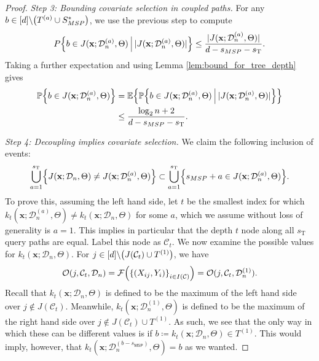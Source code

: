 \documentclass[11pt]{article}
\newcommand{\bx}{\mathbf{x}}
\DeclarePairedDelimiter{\braces}{\lbrace}{\rbrace}
\DeclarePairedDelimiter{\paren}{(}{)}
\DeclarePairedDelimiter{\abs}{|}{|}
\renewcommand{\P}{\mathbb{P}}
\newcommand{\E}{\mathbb{E}}
\newcommand{\cell}{\mathcal{C}}
\newcommand{\sparsity}{s}
\newcommand{\nfeats}{d}
\newcommand{\nsamples}{n}
\newcommand{\coordindices}{[\nfeats]}
\newcommand{\data}[1][n]{\mathcal{D}_{#1}}
\newcommand{\cellfeatindices}{J}
\newcommand{\MSP}{\textsf{MSP}}
\newcommand{\suppset}{S^*}
\newcommand{\traversal}{T}
\newcommand{\traversalsize}{\sparsity_{\operatorname{T}}}
\begin{document}
\begin{proof}
    \textit{Step 3: Bounding covariate selection in coupled paths.}
    For any $b \in \coordindices\backslash\paren*{\traversal^{(a)}\cup\suppset_{\MSP}}$, we use the previous step to compute
    \begin{equation}
        P\braces*{b \in J(\bx;\data^{(a)},\Theta)~\vline~\abs{J(\bx;\data^{(a)},\Theta)}} \leq \frac{\abs{J(\bx;\data^{(a)},\Theta)}}{\nfeats - \sparsity_{\MSP}-\traversalsize}.
    \end{equation}
    Taking a further expectation and using Lemma \ref{lem:bound_for_tree_depth} gives
    \begin{equation}
    \begin{split}
        \P\braces*{b \in J(\bx;\data^{(a)},\Theta)} & = \E\braces*{\P\braces*{b \in J(\bx;\data^{(a)},\Theta)~\vline~\abs{J(\bx;\data^{(a)},\Theta)}}} \\
        & \leq \frac{\log_2 \nsamples + 2}{\nfeats - \sparsity_{\MSP}-\traversalsize}.
    \end{split}
    \end{equation}

    \textit{Step 4: Decoupling implies covariate selection.}
    We claim the following inclusion of events:
    \begin{equation}
    \label{eq:non_msp_decoupling_covariate_selection}
        \bigcup_{a=1}^{\traversalsize}\braces*{J(\bx;\data,\Theta) \neq J(\bx;\data^{(a)},\Theta)} \subset \bigcup_{a=1}^{\traversalsize}\braces*{\sparsity_{\MSP} + a \in J(\bx;\data^{(a)},\Theta)}.
    \end{equation}
    To prove this, assuming the left hand side, let $t$ be the smallest index for which $k_t(\bx;\data^{(a)},\Theta) \neq k_t(\bx;\data,\Theta)$ for some $a$, which we assume without loss of generality is $a=1$.
    This implies in particular that the depth $t$ node along all $\traversalsize$ query paths are equal.
    Label this node as $\cell_t$.
    We now examine the possible values for $k_t(\bx;\data,\Theta)$.
    For $j \in \coordindices\backslash\paren*{\cellfeatindices(\cell_t)\cup\traversal^{(1)}}$, we have
    \begin{equation}
        \mathcal{O}(j,\cell_t,\data) = \mathcal{F}\paren*{\braces*{(X_{ij},Y_i)}_{i \in I(\cell)}} = \mathcal{O}(j,\cell_t,\data^{(1)}).
    \end{equation}
    Recall that $k_t(\bx;\data,\Theta)$ is defined to be the maximum of the left hand side over $j \notin \cellfeatindices(\cell_t)$.
    Meanwhile, $k_t(\bx;\data^{(1)},\Theta)$ is defined to be the maximum of the right hand side over $j \notin \cellfeatindices(\cell_t)\cup\traversal^{(1)}$.
    As such, we see that the only way in which these can be different values is if $b\coloneqq k_t(\bx;\data,\Theta) \in \traversal^{(1)}$.
    This would imply, however, that $k_t(\bx;\data^{(b-\sparsity_{\MSP})},\Theta) = b$ as we wanted.


\end{proof}
\end{document}
